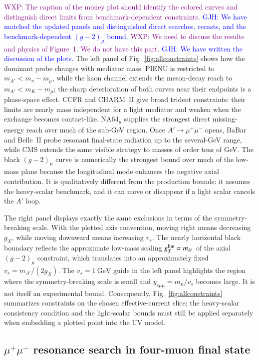 \documentclass[onecolumn, aps, nofootinbib, prd, preprint, floats, floatfix, amsmath, amssymb, superscriptaddress, preprintnumbers]{revtex4-2}
\newcommand{\GJH}[1]{\textcolor{blue}{GJH: #1}}
\newcommand{\WXP}[1]{\textcolor{purple}{WXP: #1}}
\begin{document}
\WXP{The caption of the money plot should identify the colored curves and distinguish direct limits from benchmark-dependent constraints.}
\GJH{We have matched the updated panels and distinguished direct searches, recasts, and the benchmark-dependent $(g-2)_\mu$ bound.}
\WXP{We need to discuss the results and physics of Figure~1. We do not have this part.}
\GJH{We have written the discussion of the plots.}
The left panel of Fig.~\ref{fig:allconstraints} shows how the dominant probe changes with mediator mass. PIENU is restricted to $m_{A'}<m_\pi-m_\mu$, while the kaon channel extends the meson-decay reach to $m_{A'}<m_K-m_\mu$; the sharp deterioration of both curves near their endpoints is a phase-space effect. CCFR and CHARM~II give broad trident constraints: their limits are nearly mass independent for a light mediator and weaken when the exchange becomes contact-like. NA64$_\mu$ supplies the strongest direct missing-energy reach over much of the sub-GeV region. Once $A'\to\mu^+\mu^-$ opens, BaBar and Belle~II probe resonant final-state radiation up to the several-GeV range, while CMS extends the same visible strategy to masses of order tens of GeV. The black $(g-2)_\mu$ curve is numerically the strongest bound over much of the low-mass plane because the longitudinal mode enhances the negative axial contribution. It is qualitatively different from the production bounds: it assumes the heavy-scalar benchmark, and it can move or disappear if a light scalar cancels the $A'$ loop.

The right panel displays exactly the same exclusions in terms of the symmetry-breaking scale. With the plotted axis convention, moving right means decreasing $g_X$, while moving downward means increasing $v_s$. The nearly horizontal black boundary reflects the approximate low-mass scaling $g_X^{\rm lim}\propto m_{A'}$ of the axial $(g-2)_\mu$ constraint, which translates into an approximately fixed $v_s=m_{A'}/(2g_X)$. The $v_s=1~\mathrm{GeV}$ guide in the left panel highlights the region where the symmetry-breaking scale is small and $y_{s\mu\mu}=m_\mu/v_s$ becomes large. It is not itself an experimental bound. Consequently, Fig.~\ref{fig:allconstraints} summarizes constraints on the chosen effective-current slice; the heavy-scalar consistency condition and the light-scalar bounds must still be applied separately when embedding a plotted point into the UV model.

\subsection{$\mu^+\mu^-$ resonance search in four-muon final state}
\end{document}

